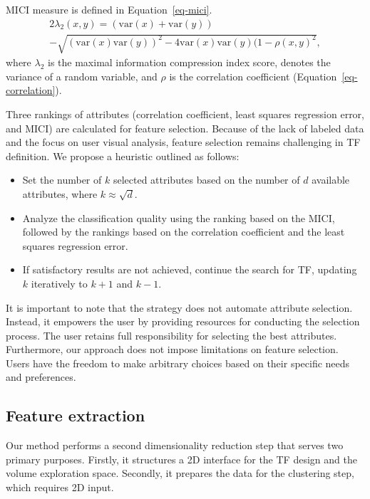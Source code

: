 MICI measure is defined in Equation~\ref{eq-mici}.
\begin{multline}
    2\lambda_2(x, y) = (\text{var}(x) + \text{var}(y)) \\
    - \sqrt{(\text{var}(x)\allowbreak \text{var}(y))^2 - 4\text{var}(x)\text{var}(y)(1-\rho(x, y)^2},
    \label{eq-mici}
\end{multline}
where $\lambda_2$ is the maximal information compression index score,   denotes the variance of a random variable, and $\rho$ is the correlation coefficient (Equation~\ref{eq-correlation}).

Three rankings of attributes (correlation coefficient, least squares regression error, and MICI) are calculated for feature selection. Because of the lack of labeled data and the focus on user visual analysis, feature selection remains challenging in TF definition. We propose a heuristic outlined as follows:
\begin{itemize}
    \item Set the number of $k$ selected attributes based on the number of $d$ available attributes, where $k \approx \sqrt{d}$.
    \item Analyze the classification quality using the ranking based on the MICI, followed by the rankings based on the correlation coefficient and the least squares regression error.
    \item If satisfactory results are not achieved, continue the search for TF, updating $k$ iteratively to $k+1$ and $k-1$.
\end{itemize}

It is important to note that the strategy does not automate attribute selection. Instead, it empowers the user by providing resources for conducting the selection process. The user retains full responsibility for selecting the best attributes. Furthermore, our approach does not impose limitations on feature selection. Users have the freedom to make arbitrary choices based on their specific needs and preferences.

\subsection{Feature extraction}
\label{subsect:feature-extraction}
Our method performs a second dimensionality reduction step that serves two primary purposes. Firstly, it structures a 2D interface for the TF design and the volume exploration space. Secondly, it prepares the data for the clustering step, which requires 2D input.

